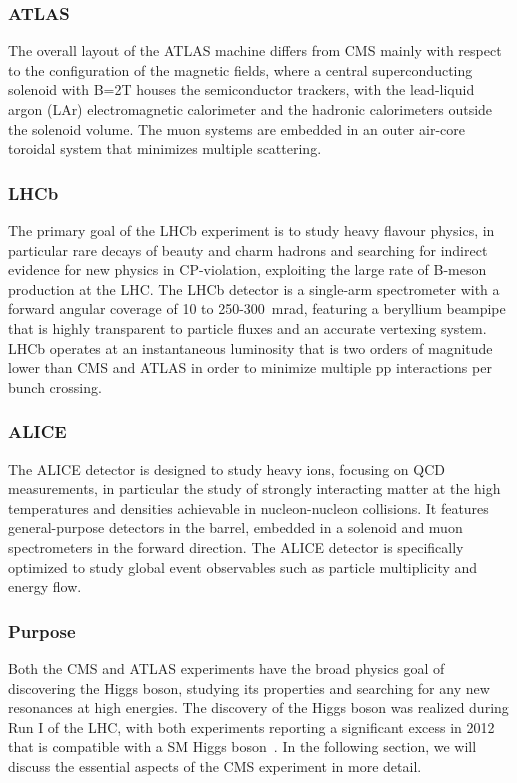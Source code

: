 \subsubsection{ATLAS}
The overall layout of the ATLAS machine differs from CMS mainly with respect to the configuration of the magnetic fields, where a central superconducting solenoid with B=2T houses the semiconductor trackers, with the lead-liquid argon (LAr) electromagnetic calorimeter and the hadronic calorimeters outside the solenoid volume. The muon systems are embedded in an outer air-core toroidal system that minimizes multiple scattering.

\subsubsection{LHCb}
The primary goal of the LHCb experiment is to study heavy flavour physics, in particular rare decays of beauty and charm hadrons and searching for indirect evidence for new physics in CP-violation, exploiting the large rate of B-meson production at the LHC. The LHCb detector is a single-arm spectrometer with a forward angular coverage of 10 to 250-300~mrad, featuring a beryllium beampipe that is highly transparent to particle fluxes and an accurate vertexing system. LHCb operates at an instantaneous luminosity that is two orders of magnitude lower than CMS and ATLAS in order to minimize multiple pp interactions per bunch crossing.

\subsubsection{ALICE}
The ALICE detector is designed to study heavy ions, focusing on QCD measurements, in particular the study of strongly interacting matter at the high temperatures and densities achievable in nucleon-nucleon collisions. It features general-purpose detectors in the barrel, embedded in a solenoid and muon spectrometers in the forward direction. The ALICE detector is specifically optimized to study global event observables such as particle multiplicity and energy flow. 

\subsubsection{Purpose}
Both the CMS and ATLAS experiments have the broad physics goal of discovering the Higgs boson, studying its properties and searching for any new resonances at high energies. The discovery of the Higgs boson was realized during Run I of the LHC, with both experiments reporting a significant excess in 2012 that is compatible with a SM Higgs boson~\cite{Aad:2012tfa,Chatrchyan:2012xdj}. In the following section, we will discuss the essential aspects of the CMS experiment in more detail.

